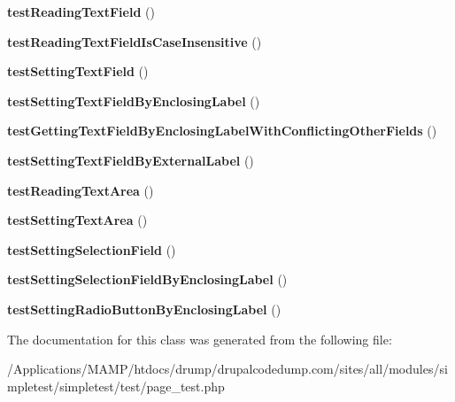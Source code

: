 \begin{DoxyCompactItemize}
\item 
\hypertarget{class_test_of_page_scraping_a31d1f62b9359731fa76d803227c10c17}{
{\bfseries testReadingTextField} ()}
\label{class_test_of_page_scraping_a31d1f62b9359731fa76d803227c10c17}

\item 
\hypertarget{class_test_of_page_scraping_ade83a22ed75f78c8443d23f8cc32bef6}{
{\bfseries testReadingTextFieldIsCaseInsensitive} ()}
\label{class_test_of_page_scraping_ade83a22ed75f78c8443d23f8cc32bef6}

\item 
\hypertarget{class_test_of_page_scraping_ad9f431cdfb46c08f0ca671c82389ae32}{
{\bfseries testSettingTextField} ()}
\label{class_test_of_page_scraping_ad9f431cdfb46c08f0ca671c82389ae32}

\item 
\hypertarget{class_test_of_page_scraping_a32c4713d8a926c8d95f40500fc99ce30}{
{\bfseries testSettingTextFieldByEnclosingLabel} ()}
\label{class_test_of_page_scraping_a32c4713d8a926c8d95f40500fc99ce30}

\item 
\hypertarget{class_test_of_page_scraping_ad6d181af5cff6ea69c1d092a9e680478}{
{\bfseries testGettingTextFieldByEnclosingLabelWithConflictingOtherFields} ()}
\label{class_test_of_page_scraping_ad6d181af5cff6ea69c1d092a9e680478}

\item 
\hypertarget{class_test_of_page_scraping_a6372ed29805fed31719655d3f572584e}{
{\bfseries testSettingTextFieldByExternalLabel} ()}
\label{class_test_of_page_scraping_a6372ed29805fed31719655d3f572584e}

\item 
\hypertarget{class_test_of_page_scraping_a7336df1f8dfba1653910681a11129cf0}{
{\bfseries testReadingTextArea} ()}
\label{class_test_of_page_scraping_a7336df1f8dfba1653910681a11129cf0}

\item 
\hypertarget{class_test_of_page_scraping_a54bab60b0baddfa7d8b317adc93f7854}{
{\bfseries testSettingTextArea} ()}
\label{class_test_of_page_scraping_a54bab60b0baddfa7d8b317adc93f7854}

\item 
\hypertarget{class_test_of_page_scraping_a4fb5679f3e6f6696396f44b705ca7d48}{
{\bfseries testSettingSelectionField} ()}
\label{class_test_of_page_scraping_a4fb5679f3e6f6696396f44b705ca7d48}

\item 
\hypertarget{class_test_of_page_scraping_aab2f85a6a64ce14ced8e0c98d8c048e2}{
{\bfseries testSettingSelectionFieldByEnclosingLabel} ()}
\label{class_test_of_page_scraping_aab2f85a6a64ce14ced8e0c98d8c048e2}

\item 
\hypertarget{class_test_of_page_scraping_a03c832562d2bbaabebaf11e4fa3ea881}{
{\bfseries testSettingRadioButtonByEnclosingLabel} ()}
\label{class_test_of_page_scraping_a03c832562d2bbaabebaf11e4fa3ea881}

\end{DoxyCompactItemize}


The documentation for this class was generated from the following file:\begin{DoxyCompactItemize}
\item 
/Applications/MAMP/htdocs/drump/drupalcodedump.com/sites/all/modules/simpletest/simpletest/test/page\_\-test.php\end{DoxyCompactItemize}
